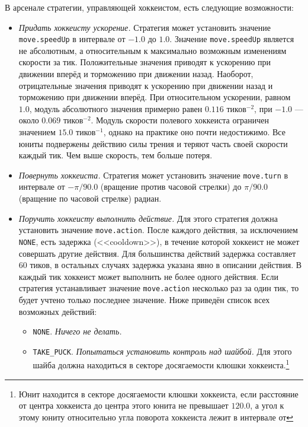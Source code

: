 В арсенале стратегии, управляющей хоккеистом, есть следующие возможности:
\begin{itemize}
  \item \textit{Придать хоккеисту ускорение.} Стратегия может установить значение \texttt{move.speedUp} в интервале от $-1.0$ до $1.0$.
        Значение \texttt{move.speedUp} является не абсолютным, а относительным к максимально возможным изменениям скорости за тик.
        Положительные значения приводят к ускорению при движении вперёд и торможению при движении назад. Наоборот, отрицательные значения
        приводят к ускорению при движении назад и торможению при движении вперёд. При относительном ускорении, равном $1.0$, модуль
        абсолютного значения примерно равен $0.116$ тиков$^{-2}$, при $-1.0$ --- около $0.069$ тиков$^{-2}$. Модуль скорости полевого
        хоккеиста ограничен значением $15.0$ тиков$^{-1}$, однако на практике оно почти недостижимо. Все юниты подвержены действию силы
        трения и теряют часть своей скорости каждый тик. Чем выше скорость, тем больше потеря.
  \item \textit{Повернуть хоккеиста.} Стратегия может установить значение \texttt{move.turn} в интервале от $-\pi/90.0$ (вращение против
        часовой стрелки) до $\pi/90.0$ (вращение по часовой стрелке) радиан.
  \item \textit{Поручить хоккеисту выполнить действие.} Для этого стратегия должна установить значение \texttt{move.action}. После каждого
        действия, за исключением \texttt{NONE}, есть задержка (<<cooldown>>), в течение которой хоккеист не может совершать другие действия.
        Для большинства действий задержка составляет $60$ тиков, в остальных случаях задержка указана явно в описании действия. В каждый тик
        хоккеист может выполнить не более одного действия. Если стратегия устанавливает значение \texttt{move.action} несколько раз за один
        тик, то будет учтено только последнее значение. Ниже приведён список всех возможных действий:
  \begin{itemize}
    \item \texttt{NONE}. \textit{Ничего не делать.}
    \item \texttt{TAKE\_PUCK}. \textit{Попытаться установить контроль над шайбой.} Для этого шайба должна находиться в секторе досягаемости
          клюшки хоккеиста.\footnote[3]{Юнит находится в секторе досягаемости клюшки хоккеиста, если расстояние от центра хоккеиста до
          центра этого юнита не превышает $120.0$, а угол к этому юниту относительно угла поворота хоккеиста лежит в интервале от
}
\end{itemize}
\end{itemize}
